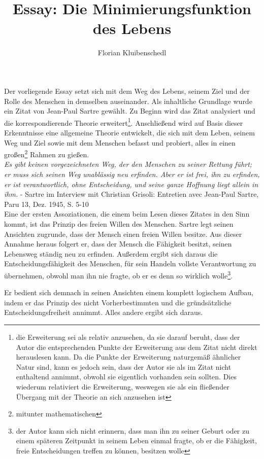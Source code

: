 \documentclass[12pt,a4paper,oneside]{article}
\author{Florian Kluibenschedl}
\title{Essay: Die Minimierungsfunktion des Lebens}
\begin{document}
  \maketitle
  
  Der vorliegende Essay setzt sich mit dem Weg des Lebens, seinem Ziel und der Rolle des Menschen in demselben auseinander. Als inhaltliche Grundlage wurde ein Zitat von Jean-Paul Sartre gewählt. Zu Beginn wird das Zitat analysiert und die korrespondierende Theorie erweitert\footnote{die Erweiterung sei als relativ anzusehen, da sie darauf beruht, dass der Autor die entsprechenden Punkte der Erweiterung aus dem Zitat nicht direkt herauslesen kann. Da die Punkte der Erweiterung naturgemäß ähnlicher Natur sind, kann es jedoch sein, dass der Autor sie als im Zitat nicht enthaltend annimmt, obwohl sie eigentlich vorhanden sein sollten. Dies wiederum relativiert die Erweiterung, weswegen sie als ein fließender Übergang mit der Theorie an sich anzusehen ist}. Anschließend wird auf Basis dieser Erkenntnisse eine allgemeine Theorie entwickelt, die sich mit dem Leben, seinem Weg und Ziel sowie mit dem Menschen befasst und probiert, alles in einen großen\footnote{mitunter mathematischen}  Rahmen zu gießen. \\
  
  \textit{\glqq Es gibt keinen vorgezeichneten Weg, der den Menschen zu seiner Rettung führt; er muss sich seinen Weg unablässig neu erfinden. Aber er ist frei, ihn zu erfinden, er ist verantwortlich, ohne Entscheidung, und seine ganze Hoffnung liegt allein in ihm.\grqq} - Sartre im Interview mit Christian Grisoli: \glqq Entretien avec Jean-Paul Sartre\grqq , Paru 13, Dez. 1945, S. 5-10 \\
  
  Eine der ersten Assoziationen, die einem beim Lesen dieses Zitates in den Sinn kommt, ist das Prinzip des freien Willen des Menschen. Sartre legt seinen Ansichten zugrunde, dass der Mensch einen freien Willen besitze. Aus dieser Annahme heraus folgert er, dass der Mensch die Fähigkeit besitzt, seinen Lebensweg ständig neu zu erfinden. Außerdem ergibt sich daraus die Entscheidungsfähigkeit des Menschen, für sein Handeln vollste Verantwortung zu übernehmen, obwohl man ihn nie fragte, ob er es denn so wirklich wolle\footnote{der Autor kann sich nicht erinnern, dass man ihn zu seiner Geburt oder zu einem späteren Zeitpunkt in seinem Leben einmal fragte, ob er die Fähigkeit, freie Entscheidungen treffen zu können, besitzen wolle}. 
  
  Er bedient sich demnach in seinen Ansichten einem komplett logischem Aufbau, indem er das Prinzip des nicht Vorherbestimmten und die gründsätzliche Entscheidungsfreiheit annimmt. Alles andere ergibt sich daraus. \\
  
\end{document}
